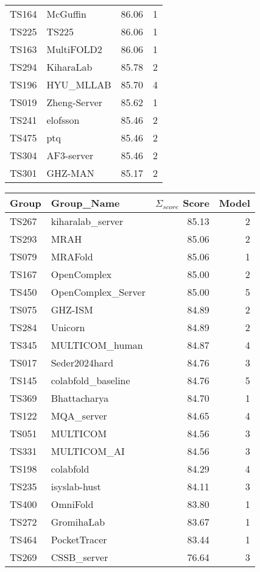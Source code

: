\begin{table*}[ht]
\begin{minipage}[t]{0.48\textwidth}
\begin{tabular}{llrr}
TS164 & McGuffin & 86.06 & 1 \\ 
TS225 & TS225 & 86.06 & 1 \\ 
TS163 & MultiFOLD2 & 86.06 & 1 \\ 
TS294 & KiharaLab & 85.78 & 2 \\ 
TS196 & HYU\_MLLAB & 85.70 & 4 \\ 
TS019 & Zheng-Server & 85.62 & 1 \\ 
TS241 & elofsson & 85.46 & 2 \\ 
TS475 & ptq & 85.46 & 2 \\ 
TS304 & AF3-server & 85.46 & 2 \\ 
TS301 & GHZ-MAN & 85.17 & 2 \\ 
\bottomrule
\end{tabular}
\end{minipage}
\hfill
\begin{minipage}[t]{0.48\textwidth}
\centering
\begin{tabular}{llrr}
\toprule
Group & Group\_Name & $\Sigma_{score}$ Score & Model \\ 
\midrule
TS267 & kiharalab\_server & 85.13 & 2 \\ 
TS293 & MRAH & 85.06 & 2 \\ 
TS079 & MRAFold & 85.06 & 1 \\ 
TS167 & OpenComplex & 85.00 & 2 \\ 
TS450 & OpenComplex\_Server & 85.00 & 5 \\ 
TS075 & GHZ-ISM & 84.89 & 2 \\ 
TS284 & Unicorn & 84.89 & 2 \\ 
TS345 & MULTICOM\_human & 84.87 & 4 \\ 
TS017 & Seder2024hard & 84.76 & 3 \\ 
TS145 & colabfold\_baseline & 84.76 & 5 \\ 
TS369 & Bhattacharya & 84.70 & 1 \\ 
TS122 & MQA\_server & 84.65 & 4 \\ 
TS051 & MULTICOM & 84.56 & 3 \\ 
TS331 & MULTICOM\_AI & 84.56 & 3 \\ 
TS198 & colabfold & 84.29 & 4 \\ 
TS235 & isyslab-hust & 84.11 & 3 \\ 
TS400 & OmniFold & 83.80 & 1 \\ 
TS272 & GromihaLab & 83.67 & 1 \\ 
TS464 & PocketTracer & 83.44 & 1 \\ 
TS269 & CSSB\_server & 76.64 & 3 \\ 

\end{tabular}
\end{minipage}
\end{table*}
